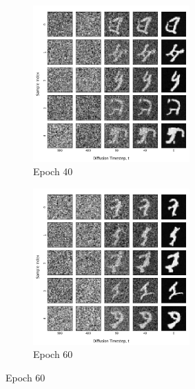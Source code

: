 \documentclass[12pt]{article}
\begin{document}
\begin{figure}[hp]
    \begin{subfigure}{0.49\textwidth}
    \includegraphics[width=0.9\linewidth, height=6cm]{figures/diffusion_plot_1_0040.png}
    \caption{Epoch 40}
    \label{fig:1_40}
    \end{subfigure}
    \begin{subfigure}{0.49\textwidth}
    \includegraphics[width=0.9\linewidth, height=6cm]{figures/diffusion_plot_1_0060.png}
    \caption{Epoch 60}
    \label{fig:1_60}
    \end{subfigure}


\end{figure}
\end{document}
